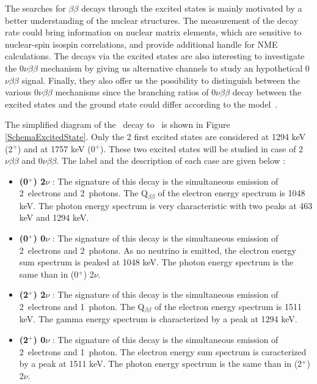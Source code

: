 \documentclass[main.tex]{subfiles}
\begin{document}
\bigskip


\NI The searches for $\beta \beta$ decays through the excited states is mainly motivated by a better understanding of the nuclear structures. The measurement of the decay rate could bring information on nuclear matrix elements, which are sensitive to nuclear-spin isospin correlations, and provide additional handle for NME calculations. The decays via the excited states are also interesting to investigate the 0$\nu\beta\beta$ mechanism by giving us alternative channels to study an hypothetical 0$\nu\beta\beta$ signal. Finally, they also offer us the possibility to distinguish between the various 0$\nu\beta\beta$ mechanisms since the branching ratios of 0$\nu\beta\beta$ decay between the excited states and the ground state could differ according to the model~\cite{TheoryOfNeutrinolessDBD}.


\bigskip


\NI The simplified diagram of the \Cd~decay to \Sn~is shown in Figure \ref{SchemaExcitedState}. Only the 2 first excited states are considered at 1294 keV (2$^+$) and at 1757 keV (0$^+$). These two excited states will be studied in case of 2$\nu\beta\beta$ and 0$\nu\beta\beta$. The label and the description of each case are given below :



\begin{itemize}
\item \textbf{(0$^+$) 2$\nu$} : The signature of this decay is the simultaneous emission of 2~electrons and 2~photons. The Q$_{\beta \beta}$ of the electron energy spectrum is 1048 keV. The photon energy spectrum is very characteristic with two peaks at 463 keV and 1294 keV.

\item \textbf{(0$^+$) 0$\nu$} : The signature of this decay is the simultaneous emission of 2~electrons and 2~photons. As no neutrino is emitted, the electron energy sum spectrum is peaked at 1048 keV. The photon energy spectrum is the same than in (0$^+$) 2$\nu$.

\item \textbf{(2$^+$) 2$\nu$} : The signature of this decay is the simultaneous emission of 2~electrons and 1~photon. The Q$_{\beta \beta}$ of the electron energy spectrum is 1511 keV. The gamma energy spectrum is characterized by a peak at 1294 keV.

\item \textbf{(2$^+$) 0$\nu$} : The signature of this decay is the simultaneous emission of 2~electrons and 1~photon. The electron energy sum spectrum is caracterized by a peak at 1511 keV. The photon energy spectrum is the same than in (2$^+$) 2$\nu$.
\end{itemize}
\end{document}
